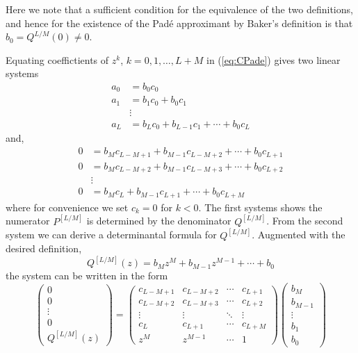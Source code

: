\documentclass{amsart}
\theoremstyle{remark}
\numberwithin{equation}{section}
\begin{document}
Here we note that a sufficient condition for the equivalence of the two definitions, and hence for the existence of the Pad\'e approximant by Baker's definition is that $b_0 = Q^{L/M}(0) \neq 0$. 

Equating coeffictients of $z^k$, $k = 0, 1, \ldots, L+M$ in (\ref{eq:CPade}) gives two linear systems
\begin{align*}
    a_0 &= b_0c_0 \\
    a_1 &= b_1c_0 + b_0c_1 \\
    &\vdots \\
    a_L &= b_Lc_0 + b_{L-1}c_1 + \cdots + b_0c_L
\end{align*}
and,
\begin{align*}
    0 &= b_{M}c_{L-M+1} + b_{M-1}c_{L-M+2} + \cdots + b_0c_{L+1} \\
    0 &= b_{M}c_{L-M+2} + b_{M-1}c_{L-M+3} + \cdots + b_0c_{L+2} \\
    &\vdots \\
    0 &= b_{M}c_L + b_{M-1}c_{L+1} + \cdots + b_0c_{L+M}
\end{align*}
where for convenience we set $c_k = 0$ for $k < 0$. The first systems shows the numerator $P^{[L/M]}$ is determined by the denominator $Q^{[L/M]}$. From the second system we can derive a determinantal formula for $Q^{[L/M]}$. Augmented with the desired definition, 
\[
    Q^{[L/M]}(z) = b_Mz^M + b_{M-1}z^{M-1} + \cdots + b_0
\]
the system can be written in the form
\[
    \begin{pmatrix}
        0 \\ 0 \\ \vdots \\ 0 \\ Q^{[L/M]}(z)
    \end{pmatrix}
    =
    \begin{pmatrix}
        c_{L-M+1} & c_{L-M+2} & \cdots & c_{L+1} \\
        c_{L-M+2} & c_{L-M+3} & \cdots & c_{L+2} \\
        \vdots & \vdots & \ddots & \vdots \\
        c_{L} & c_{L+1} & \cdots & c_{L+M} \\
        z^M & z^{M-1} & \cdots & 1
    \end{pmatrix}
    \begin{pmatrix}
        b_M \\ b_{M-1} \\ \vdots \\ b_1 \\ b_0
    \end{pmatrix}
\]
\end{document}
